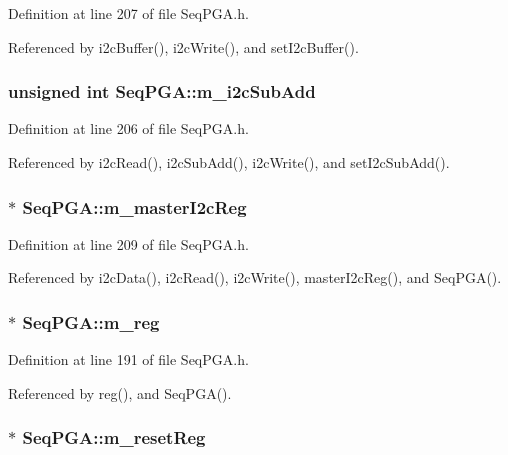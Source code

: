 Definition at line 207 of file SeqPGA.h.

Referenced by i2cBuffer(), i2cWrite(), and setI2cBuffer().\hypertarget{classSeqPGA_a82bda98edb9681aff47733e83ac8bc4f}{
\subsubsection[{m\_\-i2cSubAdd}]{\setlength{\rightskip}{0pt plus 5cm}unsigned int {\bf SeqPGA::m\_\-i2cSubAdd}}}
\label{classSeqPGA_a82bda98edb9681aff47733e83ac8bc4f}


Definition at line 206 of file SeqPGA.h.

Referenced by i2cRead(), i2cSubAdd(), i2cWrite(), and setI2cSubAdd().\hypertarget{classSeqPGA_a942c71b33a4f43b7a994cb9216abb17e}{
\subsubsection[{m\_\-masterI2cReg}]{$\ast$ {\bf SeqPGA::m\_\-masterI2cReg}}}
\label{classSeqPGA_a942c71b33a4f43b7a994cb9216abb17e}


Definition at line 209 of file SeqPGA.h.

Referenced by i2cData(), i2cRead(), i2cWrite(), masterI2cReg(), and SeqPGA().\hypertarget{classSeqPGA_afd827f1d3d55b0a8efafbd79a8c54a52}{
\subsubsection[{m\_\-reg}]{$\ast$ {\bf SeqPGA::m\_\-reg}}}
\label{classSeqPGA_afd827f1d3d55b0a8efafbd79a8c54a52}


Definition at line 191 of file SeqPGA.h.

Referenced by reg(), and SeqPGA().\hypertarget{classSeqPGA_a8c519e98b992ab872622e95dae4461d8}{
\subsubsection[{m\_\-resetReg}]{$\ast$ {\bf SeqPGA::m\_\-resetReg}}}
\label{classSeqPGA_a8c519e98b992ab872622e95dae4461d8}


